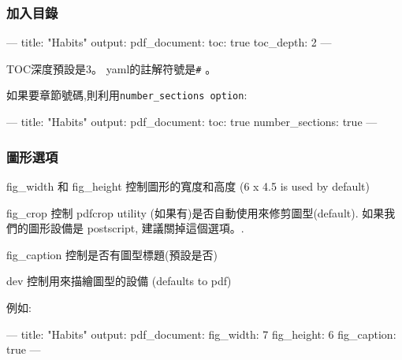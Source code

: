 \documentclass[]{book}
\newenvironment{Shaded}{\begin{snugshade}}{\end{snugshade}}
\newcommand{\StringTok}[1]{\textcolor[rgb]{0.31,0.60,0.02}{#1}}
\newcommand{\OtherTok}[1]{\textcolor[rgb]{0.56,0.35,0.01}{#1}}
\newcommand{\FunctionTok}[1]{\textcolor[rgb]{0.00,0.00,0.00}{#1}}
\newcommand{\AttributeTok}[1]{\textcolor[rgb]{0.77,0.63,0.00}{#1}}
\theoremstyle{definition}
\theoremstyle{definition}
\theoremstyle{definition}
\theoremstyle{remark}
\begin{document}
\subsubsection{加入目錄}

\begin{Shaded}
\begin{Highlighting}[]
\OtherTok{---}
\FunctionTok{title:}\AttributeTok{ }\StringTok{"Habits"}
\FunctionTok{output:}
  \FunctionTok{pdf_document:}
    \FunctionTok{toc:}\AttributeTok{ true}
    \FunctionTok{toc_depth:}\AttributeTok{ 2}
\OtherTok{---}
\end{Highlighting}
\end{Shaded}

TOC深度預設是3。 yaml的註解符號是\texttt{\#} 。

如果要章節號碼,則利用\texttt{number\_sections\ option}:

\begin{Shaded}
\begin{Highlighting}[]
\OtherTok{---}
\FunctionTok{title:}\AttributeTok{ }\StringTok{"Habits"}
\FunctionTok{output:}
  \FunctionTok{pdf_document:}
    \FunctionTok{toc:}\AttributeTok{ true}
    \FunctionTok{number_sections:}\AttributeTok{ true}
\OtherTok{---}
\end{Highlighting}
\end{Shaded}

\subsubsection{圖形選項}

fig\_width 和 fig\_height 控制圖形的寬度和高度 (6 x 4.5 is used by
default)

fig\_crop 控制 pdfcrop utility (如果有)是否自動使用來修剪圖型(default).
如果我們的圖形設備是 postscript, 建議關掉這個選項。.

fig\_caption 控制是否有圖型標題(預設是否)

dev 控制用來描繪圖型的設備 (defaults to pdf)

例如:

\begin{Shaded}
\begin{Highlighting}[]
\OtherTok{---}
\FunctionTok{title:}\AttributeTok{ }\StringTok{"Habits"}
\FunctionTok{output:}
  \FunctionTok{pdf_document:}
    \FunctionTok{fig_width:}\AttributeTok{ 7}
    \FunctionTok{fig_height:}\AttributeTok{ 6}
    \FunctionTok{fig_caption:}\AttributeTok{ true}
\OtherTok{---}
\end{Highlighting}
\end{Shaded}
\end{document}
